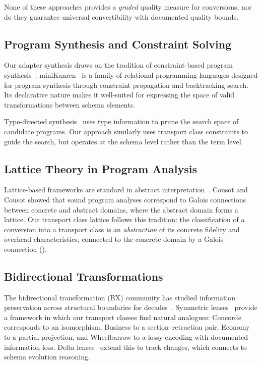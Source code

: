 \documentclass[11pt,a4paper]{article}
\theoremstyle{definition}
\theoremstyle{remark}
\begin{document}
None of these approaches provides a \emph{graded} quality measure for
conversions, nor do they guarantee universal convertibility with
documented quality bounds.

\subsection{Program Synthesis and Constraint Solving}

Our adapter synthesis draws on the tradition of constraint-based program
synthesis~\cite{gulwani2017synthesis}. miniKanren~\cite{byrd2017minikanren,
friedman2005reasoned} is a family of relational programming languages
designed for program synthesis through constraint propagation and
backtracking search. Its declarative nature makes it well-suited for
expressing the space of valid transformations between schema elements.

Type-directed synthesis~\cite{polikarpova2016program,
frankle2016example} uses type information to prune the search space of
candidate programs. Our approach similarly uses transport class
constraints to guide the search, but operates at the schema level
rather than the term level.

\subsection{Lattice Theory in Program Analysis}

Lattice-based frameworks are standard in abstract
interpretation~\cite{cousot1977abstract}. Cousot and Cousot showed
that sound program analyses correspond to Galois connections between
concrete and abstract domains, where the abstract domain forms a
lattice. Our transport class lattice follows this tradition: the
classification of a conversion into a transport class is an
\emph{abstraction} of its concrete fidelity and overhead
characteristics, connected to the concrete domain by a Galois
connection ().

\subsection{Bidirectional Transformations}

The bidirectional transformation (BX) community has studied information
preservation across structural boundaries for
decades~\cite{czarnecki2009bidirectional}. Symmetric
lenses~\cite{hofmann2011symmetric} provide a framework in which our
transport classes find natural analogues: Concorde corresponds to an
isomorphism, Business to a section--retraction pair, Economy to a
partial projection, and Wheelbarrow to a lossy encoding with
documented information loss. Delta lenses~\cite{diskin2011delta}
extend this to track changes, which connects to schema evolution
reasoning.
\end{document}
